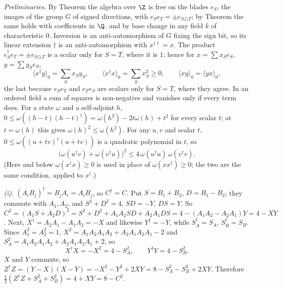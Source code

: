 \emph{Preliminaries.} By Theorem  the algebra over $\Z$ is free on the blades $e_{S}$, the images of the group $G$ of signed directions, with $e_{S}e_{T} = \pm e_{S \triangle T}$; by Theorem  the same holds with coefficients in $\Q$, and by base change in any field $k$ of characteristic $0$. Inversion is an anti-automorphism of $G$ fixing the sign bit, so its linear extension $\dagger$ is an anti-automorphism with $x^{\dagger\dagger} = x$. The product $e_{S}^{\dagger}e_{T} = \pm e_{S \triangle T}$ is a scalar only for $S = T$, where it is $1$; hence for $x = \sum x_{S}e_{S}$, $y = \sum y_{S}e_{S}$,
\[
\langle x^{\dagger}y\rangle_{0} = \sum_{S}x_{S}y_{S}, \qquad \langle x^{\dagger}x\rangle_{0} = \sum_{S}x_{S}^{2} \ge 0, \qquad \langle xy\rangle_{0} = \langle yx\rangle_{0},
\]
the last because $e_{S}e_{T}$ and $e_{T}e_{S}$ are scalars only for $S = T$, where they agree. In an ordered field a sum of squares is non-negative and vanishes only if every term does. For a state $\omega$ and a self-adjoint $h$, $0 \le \omega((h - t)(h - t)^{\dagger}) = \omega(h^{2}) - 2t\omega(h) + t^{2}$ for every scalar $t$; at $t = \omega(h)$ this gives $\omega(h)^{2} \le \omega(h^{2})$. For any $u, v$ and scalar $t$, $0 \le \omega((u + tv)^{\dagger}(u + tv))$ is a quadratic polynomial in $t$, so
\[
\bigl(\omega(u^{\dagger}v) + \omega(v^{\dagger}u)\bigr)^{2} \le 4\,\omega(u^{\dagger}u)\,\omega(v^{\dagger}v). \tag{CS}
\]
(Here and below $\omega(x^{\dagger}x) \ge 0$ is used in place of $\omega(xx^{\dagger}) \ge 0$; the two are the same condition, applied to $x^{\dagger}$.)

\emph{(i).} $(A_{i}B_{j})^{\dagger} = B_{j}A_{i} = A_{i}B_{j}$, so $C^{\dagger} = C$. Put $S = B_{1} + B_{2}$, $D = B_{1} - B_{2}$; they commute with $A_{1}, A_{2}$, and $S^{2} + D^{2} = 4$, $SD = -Y$, $DS = Y$. So $C^{2} = (A_{1}S + A_{2}D)^{2} = S^{2} + D^{2} + A_{1}A_{2}SD + A_{2}A_{1}DS = 4 - (A_{1}A_{2} - A_{2}A_{1})Y = 4 - XY$. Next, $X^{\dagger} = A_{2}A_{1} - A_{1}A_{2} = -X$ and likewise $Y^{\dagger} = -Y$, while $S_{A}^{\dagger} = S_{A}$, $S_{B}^{\dagger} = S_{B}$. Since $A_{1}^{2} = A_{2}^{2} = 1$, $X^{2} = A_{1}A_{2}A_{1}A_{2} + A_{2}A_{1}A_{2}A_{1} - 2$ and $S_{A}^{2} = A_{1}A_{2}A_{1}A_{2} + A_{2}A_{1}A_{2}A_{1} + 2$, so
\[
X^{\dagger}X = -X^{2} = 4 - S_{A}^{2}, \qquad Y^{\dagger}Y = 4 - S_{B}^{2}.
\]
$X$ and $Y$ commute, so $Z^{\dagger}Z = (Y - X)(X - Y) = -X^{2} - Y^{2} + 2XY = 8 - S_{A}^{2} - S_{B}^{2} + 2XY$. Therefore $\tfrac12(Z^{\dagger}Z + S_{A}^{2} + S_{B}^{2}) = 4 + XY = 8 - C^{2}$.


